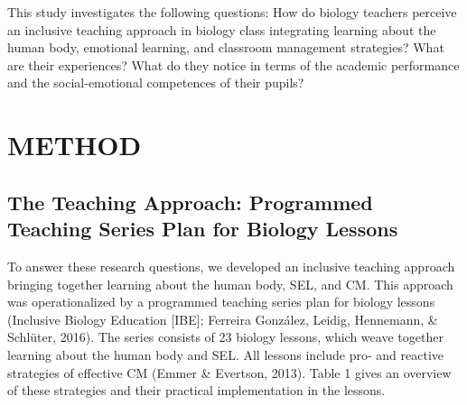 \documentclass[11.5pt]{sig-alternate} %
\begin{document}
\begin{large}
This study investigates the following questions: How do biology teachers perceive an inclusive teaching approach in biology class integrating learning about the human body, emotional learning, and classroom management strategies? What are their experiences? What do they notice in terms of the academic performance and the social-emotional competences of their pupils?

\section*{METHOD}

\subsection*{The Teaching Approach: Programmed Teaching Series Plan for Biology Lessons}

To answer these research questions, we developed an inclusive teaching approach bringing together learning about the human body, SEL, and CM. This approach was operationalized by a programmed teaching series plan for biology lessons (Inclusive Biology Education [IBE]; Ferreira González, Leidig, Hennemann, \& Schlüter, 2016). The series consists of 23 biology lessons, which weave together learning about the human body and SEL. All lessons include pro- and reactive strategies of effective CM (Emmer \& Evertson, 2013). Table 1 gives an overview of these strategies and their practical implementation in the lessons. 


\end{large}
\end{document}
